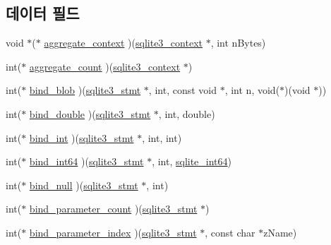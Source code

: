 \subsection*{데이터 필드}
\begin{DoxyCompactItemize}
\item 
void $\ast$($\ast$ \hyperlink{structsqlite3__api__routines_a9ab2057c3042c5136b05f7daab66b4f4}{aggregate\+\_\+context} )(\hyperlink{sqlite3_8h_a3b519553ffec8fc42b2356f5b1ebdc57}{sqlite3\+\_\+context} $\ast$, int n\+Bytes)
\item 
int($\ast$ \hyperlink{structsqlite3__api__routines_aa2f39986a5de8ec01fb5cb2aa573c08d}{aggregate\+\_\+count} )(\hyperlink{sqlite3_8h_a3b519553ffec8fc42b2356f5b1ebdc57}{sqlite3\+\_\+context} $\ast$)
\item 
int($\ast$ \hyperlink{structsqlite3__api__routines_a2e84de4afd1ba42151a75df4d7480a72}{bind\+\_\+blob} )(\hyperlink{sqlite3_8h_af2a033da1327cdd77f0a174a09aedd0c}{sqlite3\+\_\+stmt} $\ast$, int, const void $\ast$, int n, void($\ast$)(void $\ast$))
\item 
int($\ast$ \hyperlink{structsqlite3__api__routines_abcdefbe78ab3ce4324d86651c03e8470}{bind\+\_\+double} )(\hyperlink{sqlite3_8h_af2a033da1327cdd77f0a174a09aedd0c}{sqlite3\+\_\+stmt} $\ast$, int, double)
\item 
int($\ast$ \hyperlink{structsqlite3__api__routines_a70b6cc78957f11ff206df6125973daea}{bind\+\_\+int} )(\hyperlink{sqlite3_8h_af2a033da1327cdd77f0a174a09aedd0c}{sqlite3\+\_\+stmt} $\ast$, int, int)
\item 
int($\ast$ \hyperlink{structsqlite3__api__routines_ac71b110c165973291cc257973e7d6243}{bind\+\_\+int64} )(\hyperlink{sqlite3_8h_af2a033da1327cdd77f0a174a09aedd0c}{sqlite3\+\_\+stmt} $\ast$, int, \hyperlink{sqlite3_8h_a520a95f9080c018b2fade39885bd2e2a}{sqlite\+\_\+int64})
\item 
int($\ast$ \hyperlink{structsqlite3__api__routines_a78d546c352de656db3c15e7cc6255228}{bind\+\_\+null} )(\hyperlink{sqlite3_8h_af2a033da1327cdd77f0a174a09aedd0c}{sqlite3\+\_\+stmt} $\ast$, int)
\item 
int($\ast$ \hyperlink{structsqlite3__api__routines_acd345a944505eb7928568f01d7a4fe5a}{bind\+\_\+parameter\+\_\+count} )(\hyperlink{sqlite3_8h_af2a033da1327cdd77f0a174a09aedd0c}{sqlite3\+\_\+stmt} $\ast$)
\item 
int($\ast$ \hyperlink{structsqlite3__api__routines_af4ade5152fd51b1311463014b48dd05d}{bind\+\_\+parameter\+\_\+index} )(\hyperlink{sqlite3_8h_af2a033da1327cdd77f0a174a09aedd0c}{sqlite3\+\_\+stmt} $\ast$, const char $\ast$z\+Name)

\end{DoxyCompactItemize}
